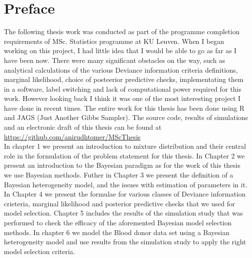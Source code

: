 
\chapter{Preface}
\label{ch : preface}

The following thesis work was conducted as part of the programme completion requirements of MSc. Statistics programme at KU Leuven. When I began working on this project, I had little idea that I would be able to go as far as I have been now. There were many significant obstacles on the way, such as analytical calculations of the various Deviance information criteria definitions, marginal likelihood, choice of posteerior predictive checks, implementating them in a software, label switching and lack of computational power required for this work. However looking back I think it was one of the most interesting project I have done in recent times. The entire work for this thesis has been done using R and JAGS (Just Another Gibbs Sampler). The source code, results of simulations and an electronic draft of this thesis can be found at\\
\url{https://github.com/anirudhtomer/MScThesis}\\

In chapter 1 we present an introduction to mixture distribution and their central role in the formulation of the problem statement for this thesis. In Chapter 2 we present an introduction to the Bayesian paradigm as for the work of this thesis we use Bayesian methods. Futher in Chapter 3 we present the definition of a Bayesian heterogeneity model, and the issues with estimation of parameters in it. In Chapter 4 we present the formulae for various classes of Deviance information crieteria, marginal likelihood and posterior predictive checks that we used for model selection. Chapter 5 includes the results of the simulation study that was performed to check the efficacy of the aforemented Bayesian model selection methods. In chapter 6 we model the Blood donor data set \citep{nasserinejad_prevalence_2015} using a Bayesian heterogeneity model and use results from the simulation study to apply the right model selection criteria.\\

